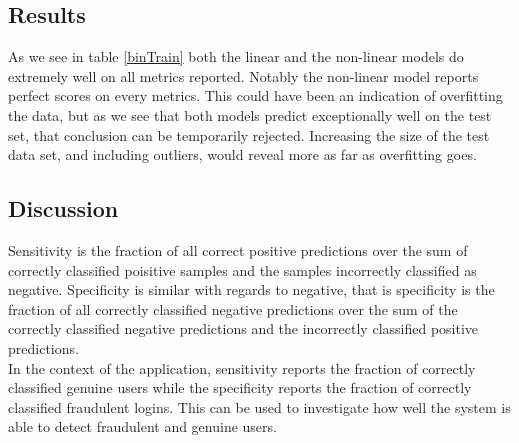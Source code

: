 \subsection{Results}
\begin{minipage}[b]{0.45\textwidth}
  \centering
  \label{binTrain}
\end{minipage}
\hspace{0.5cm}
\begin{minipage}[b]{0.45\textwidth}
  \centering
  \label{binTest}
\end{minipage}

As we see in table \ref{binTrain} both the linear and the non-linear models do extremely well on all metrics reported. Notably the non-linear model reports perfect scores on every metrics. This could have been an indication of overfitting the data, but as we see that both models predict exceptionally well on the test set, that conclusion can be temporarily rejected. Increasing the size of the test data set, and including outliers, would reveal more as far as overfitting goes.

\subsection{Discussion}
Sensitivity is the fraction of all correct positive predictions over the sum of correctly classified poisitive samples and the samples incorrectly classified as negative. Specificity is similar with regards to negative, that is specificity is the fraction of all correctly classified negative predictions over the sum of the correctly classified negative predictions and the incorrectly classified positive predictions.\\

In the context of the application, sensitivity reports the fraction of correctly classified genuine users while the specificity reports the fraction of correctly classified fraudulent logins. This can be used to investigate how well the system is able to detect fraudulent and genuine users.
